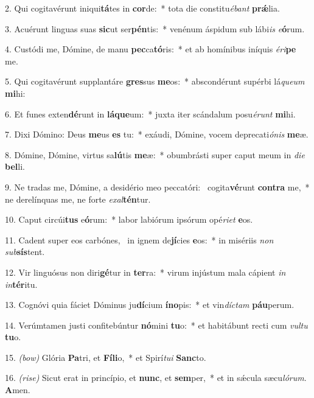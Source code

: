 2. Qui cogitavérunt iniqui\textbf{tá}tes in \textbf{cor}de:~* tota die constitu\textit{é}\textit{bant} \textbf{pr\'{\ae}}lia.

3. Acuérunt linguas suas \textbf{sic}ut ser\textbf{pén}tis:~* venénum áspidum sub lábi\textit{is} \textit{e}\textbf{ó}rum.

4. Custódi me, Dómine, de manu \textbf{pec}ca\textbf{tó}ris:~* et ab homínibus iníquis \textit{é}\textit{ri}\textbf{pe} me.

5. Qui cogitavérunt supplantáre \textbf{gres}sus \textbf{me}os:~* abscondérunt supérbi lá\textit{que}\textit{um} \textbf{mi}hi:

6. Et funes exten\textbf{dé}runt in \textbf{lá}\textbf{que}um:~* juxta iter scándalum posu\textit{é}\textit{runt} \textbf{mi}hi.

7. Dixi Dómino: Deus \textbf{me}us \textbf{es} tu:~* exáudi, Dómine, vocem deprecati\textit{ó}\textit{nis} \textbf{me}æ.

8. Dómine, Dómine, virtus sa\textbf{lú}tis \textbf{me}æ:~* obumbrásti super caput meum in \textit{di}\textit{e} \textbf{bel}li.

9. Ne tradas me, Dómine, a desidério meo peccatóri:~{\color{red}\GreDagger} cogita\textbf{vé}runt \textbf{con}\textbf{tra} me,~* ne derelínquas me, ne forte \textit{ex}\textit{al}\textbf{tén}tur.

10. Caput circúi\textbf{tus} e\textbf{ó}rum:~* labor labiórum ipsórum opé\textit{ri}\textit{et} \textbf{e}os.

11. Cadent super eos carbónes,~{\color{red}\GreDagger} in ignem de\textbf{jí}cies \textbf{e}os:~* in misériis \textit{non} \textit{sub}\textbf{sís}tent.

12. Vir linguósus non diri\textbf{gé}tur in \textbf{ter}ra:~* virum injústum mala cápient \textit{in} \textit{in}\textbf{tér}itu.

13. Cognóvi quia fáciet Dóminus ju\textbf{dí}cium \textbf{ín}\textbf{o}pis:~* et vin\textit{díc}\textit{tam} \textbf{páu}perum.

14. Verúmtamen justi confitebúntur \textbf{nó}mini \textbf{tu}o:~* et habitábunt recti cum \textit{vul}\textit{tu} \textbf{tu}o.

15. {\color{red}\textit{(bow)}} Glória \textbf{Pa}tri, et \textbf{Fí}\textbf{li}o,~* et Spirí\textit{tu}\textit{i} \textbf{Sanc}to.

16. {\color{red}\textit{(rise)}} Sicut erat in princípio, et \textbf{nunc}, et \textbf{sem}per,~* et in s\'{\ae}cula sæcu\textit{ló}\textit{rum}. \textbf{A}men.
